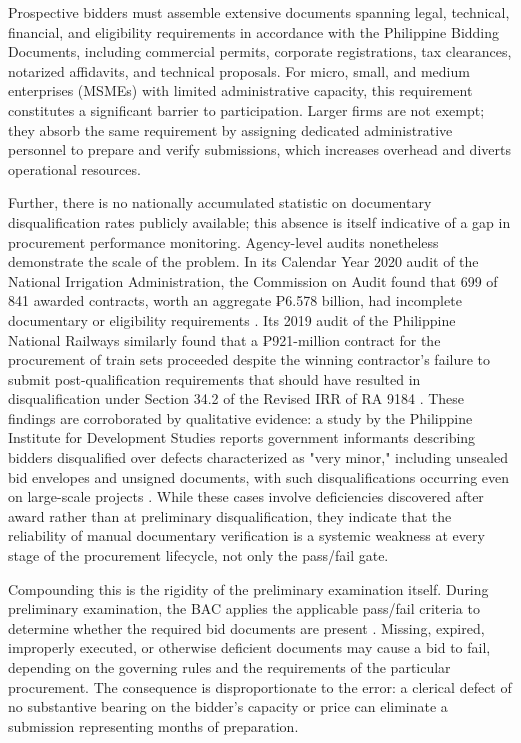 Prospective bidders must assemble extensive documents spanning legal, technical, financial, and eligibility requirements in accordance with the Philippine Bidding Documents, including commercial permits, corporate registrations, tax clearances, notarized affidavits, and technical proposals.
For micro, small, and medium enterprises (MSMEs) with limited administrative capacity, this requirement constitutes a significant barrier to participation.
Larger firms are not exempt; they absorb the same requirement by assigning dedicated administrative personnel to prepare and verify submissions, which increases overhead and diverts operational resources.

Further, there is no nationally accumulated statistic on documentary disqualification rates publicly available; this absence is itself indicative of a gap in procurement performance monitoring.
Agency-level audits nonetheless demonstrate the scale of the problem.
In its Calendar Year 2020 audit of the National Irrigation Administration, the Commission on Audit found that 699 of 841 awarded contracts, worth an aggregate ₱6.578 billion, had incomplete documentary or eligibility requirements \cite{ref3}.
Its 2019 audit of the Philippine National Railways similarly found that a ₱921-million contract for the procurement of train sets proceeded despite the winning contractor's failure to submit post-qualification requirements that should have resulted in disqualification under Section 34.2 of the Revised IRR of RA 9184 \cite{ref4}.
These findings are corroborated by qualitative evidence: a study by the Philippine Institute for Development Studies reports government informants describing bidders disqualified over defects characterized as "very minor," including unsealed bid envelopes and unsigned documents, with such disqualifications occurring even on large-scale projects \cite{ref5}.
While these cases involve deficiencies discovered after award rather than at preliminary disqualification, they indicate that the reliability of manual documentary verification is a systemic weakness at every stage of the procurement lifecycle, not only the pass/fail gate.

Compounding this is the rigidity of the preliminary examination itself.
During preliminary examination, the BAC applies the applicable pass/fail criteria to determine whether the required bid documents are present \cite{ref2}.
Missing, expired, improperly executed, or otherwise deficient documents may cause a bid to fail, depending on the governing rules and the requirements of the particular procurement.
The consequence is disproportionate to the error: a clerical defect of no substantive bearing on the bidder's capacity or price can eliminate a submission representing months of preparation.

